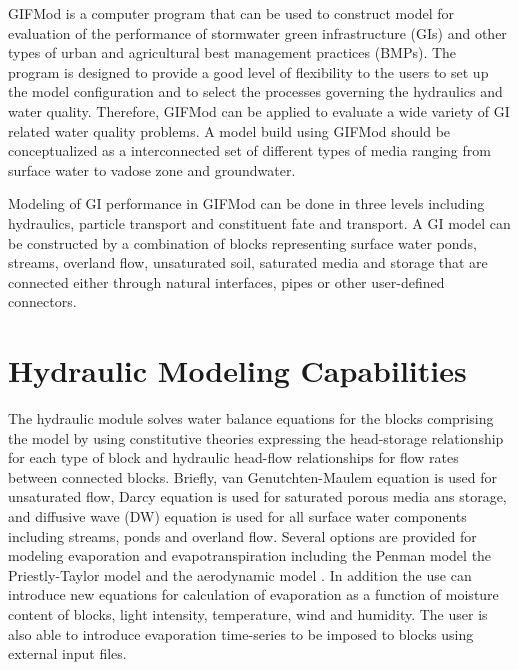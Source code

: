 GIFMod is a computer program that can be used to construct model for evaluation of the performance of stormwater green infrastructure (GIs) and other types of urban and agricultural best management practices (BMPs). The program is designed to provide a good level of flexibility to the users to set up the model configuration and to select the processes governing the hydraulics and water quality. Therefore, GIFMod can be applied to evaluate a wide variety of GI related water quality problems. A model build using GIFMod should be conceptualized as a interconnected set of different types of media ranging from surface water to vadose zone and groundwater. 

Modeling of GI performance in GIFMod can be done in three levels including hydraulics, particle transport and constituent fate and transport. A GI model can be constructed by a combination of blocks representing surface water ponds, streams, overland flow, unsaturated soil, saturated media and storage that are connected either through natural interfaces, pipes or other user-defined connectors. 

\section{Hydraulic Modeling Capabilities}
The hydraulic module solves water balance equations for the blocks comprising the model by using constitutive theories expressing the head-storage relationship for each type of block and hydraulic head-flow relationships for flow rates between connected blocks. Briefly, van Genutchten-Maulem \citep{Mualem1976,VanGenuchten1980} equation is used for unsaturated flow, Darcy equation is used for saturated porous media ans storage, and diffusive wave (DW) equation is used for all surface water components including streams, ponds and overland flow. Several options are provided for modeling evaporation and evapotranspiration including the Penman model \citep{allen1998} the Priestly-Taylor model \citep{Priestley1972} and the aerodynamic model \citep{mays2010}. In addition the use can introduce new equations for calculation of evaporation as a function of moisture content of blocks, light intensity, temperature, wind and humidity. The user is also able to introduce evaporation time-series to be imposed to blocks using external input files.  

